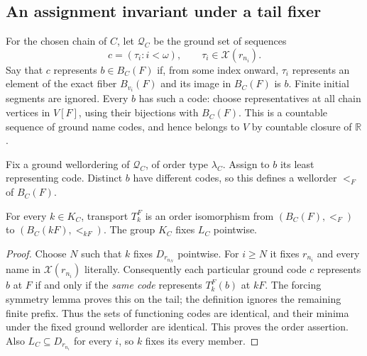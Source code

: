\subsection{An assignment invariant under a tail fixer}

For the chosen chain of $C$, let $\mathcal Q_C$ be the ground set of
sequences
\[
 c=(\tau_i:i<\omega),\qquad \tau_i\in\mathcal X(r_{n_i}).
\]
Say that $c$ represents $b\in B_C(F)$ if, from some index onward,
$\tau_i$ represents an element of the exact fiber $B_{v_i}(F)$ and
its image in $B_C(F)$ is $b$. Finite initial segments are ignored.
Every $b$ has such a code: choose representatives at all chain
vertices in $V[F]$, using their bijections with $B_C(F)$. This is a
countable sequence of ground name codes, and hence belongs to $V$
by countable closure of $\mathbb R$.

Fix a ground wellordering of $\mathcal Q_C$, of order type $\lambda_C$.
Assign to $b$ its least representing code. Distinct $b$ have different
codes, so this defines a wellorder $<_F$ of $B_C(F)$.

\begin{lemma}
\label{lem:least-code-covariance}
For every $k\in K_C$, transport $T_k^F$ is an order isomorphism
from $(B_C(F),<_F)$ to $(B_C(kF),<_{kF})$. The group $K_C$ fixes
$L_C$ pointwise.
\end{lemma}
\begin{proof}
Choose $N$ such that $k$ fixes $D_{r_{n_N}}$ pointwise. For $i\ge N$
it fixes $r_{n_i}$ and every name in $\mathcal X(r_{n_i})$ literally.
Consequently each particular ground code $c$ represents $b$ at $F$
if and only if the \emph{same code} represents $T_k^F(b)$ at $kF$.
The forcing symmetry lemma proves this on the tail; the definition
ignores the remaining finite prefix. Thus the sets of functioning
codes are identical, and their minima under the fixed ground
wellorder are identical. This proves the order assertion. Also
$L_C\subseteq D_{r_{n_i}}$ for every $i$, so $k$ fixes its every
member.
\end{proof}

